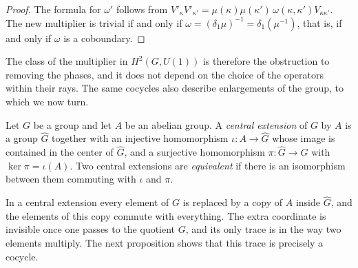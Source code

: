 \begin{proof}
	The formula for $\omega'$ follows from $V'_\kappa V'_{\kappa'}=\mu(\kappa)\mu(\kappa')\,\omega(\kappa,\kappa')V_{\kappa\kappa'}$. The new multiplier is trivial if and only if $\omega=(\delta_1\mu)^{-1}=\delta_1(\mu^{-1})$, that is, if and only if $\omega$ is a coboundary.
\end{proof}

\noindent The class of the multiplier in $H^2(G,U(1))$ is therefore the obstruction to removing the phases, and it does not depend on the choice of the operators within their rays. The same cocycles also describe enlargements of the group, to which we now turn.

\begin{definition}\label{def:central-extension}
	Let $G$ be a group and let $A$ be an abelian group. A \emph{central extension} of $G$ by $A$ is a group $\widehat{G}$ together with an injective homomorphism $\iota:A\to\widehat{G}$ whose image is contained in the center of $\widehat{G}$, and a surjective homomorphism $\pi:\widehat{G}\to G$ with $\ker\pi=\iota(A)$. Two central extensions are \emph{equivalent} if there is an isomorphism between them commuting with $\iota$ and $\pi$.
\end{definition}

\begin{remark}
	In a central extension every element of $G$ is replaced by a copy of $A$ inside $\widehat{G}$, and the elements of this copy commute with everything. The extra coordinate is invisible once one passes to the quotient $G$, and its only trace is in the way two elements multiply. The next proposition shows that this trace is precisely a cocycle.
\end{remark}

